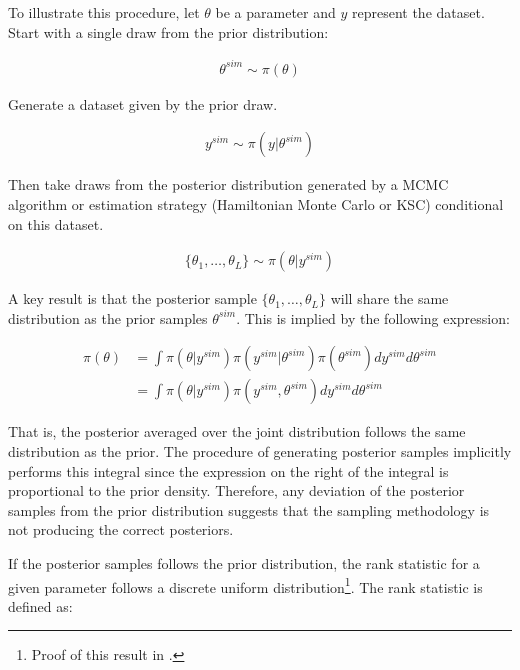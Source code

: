 \documentclass[12pt, a4paper]{article}
\begin{document}
        To illustrate this procedure, let $\theta$ be a parameter and $y$ represent the dataset. Start with a single draw from the prior distribution:
        
        $$
        \begin{aligned}
        \theta^{sim} \sim \pi(\theta)
        \end{aligned}
        $$

        Generate a dataset given by the prior draw.

        $$
        \begin{aligned}
        y^{sim} \sim \pi (y|\theta^{sim})
        \end{aligned}
        $$

        Then take draws from the posterior distribution generated by a MCMC algorithm or estimation strategy (Hamiltonian Monte Carlo or KSC) conditional on this dataset.

        $$
        \begin{aligned}
        \{\theta_1,\dots , \theta_{L}\} \sim \pi (\theta | y^{sim})
        \end{aligned}
        $$

        A key result is that the posterior sample $\{\theta_1,\dots , \theta_{L}\}$ will share the same distribution as the prior samples $\theta^{sim}$. This is implied by the following expression:

        $$
        \begin{aligned}
        \pi(\theta) &= \int \pi(\theta|y^{sim}) \pi(y^{sim}|\theta^{sim}) \pi(\theta^{sim})dy^{sim} d\theta^{sim} \\
        &= \int \pi(\theta|y^{sim}) \pi(y^{sim},\theta^{sim}) dy^{sim} d\theta^{sim}
        \end{aligned}
        $$

        That is, the posterior averaged over the joint distribution follows the same distribution as the prior. The procedure of generating posterior samples implicitly performs this integral since the expression on the right of the integral is proportional to the prior density. Therefore, any deviation of the posterior samples from the prior distribution suggests that the sampling methodology is not producing the correct posteriors.

        If the posterior samples follows the prior distribution, the rank statistic for a given parameter follows a discrete uniform distribution\footnote{Proof of this result in \citet{talts2018validating}.}. The rank statistic is defined as:
\end{document}
